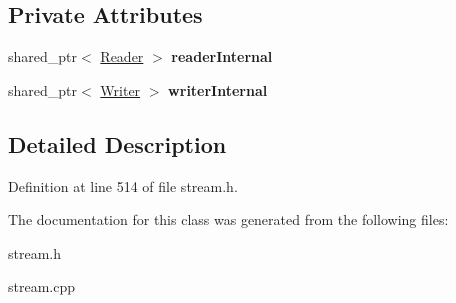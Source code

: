 \subsection*{Private Attributes}
\begin{DoxyCompactItemize}
\item 
\hypertarget{classStreamPipe_a064228ea3b24262abcfe7247c60fdf87}{shared\+\_\+ptr$<$ \hyperlink{classReader}{Reader} $>$ {\bfseries reader\+Internal}}\label{classStreamPipe_a064228ea3b24262abcfe7247c60fdf87}

\item 
\hypertarget{classStreamPipe_a7ec905352427510572e548323e6653b2}{shared\+\_\+ptr$<$ \hyperlink{classWriter}{Writer} $>$ {\bfseries writer\+Internal}}\label{classStreamPipe_a7ec905352427510572e548323e6653b2}

\end{DoxyCompactItemize}


\subsection{Detailed Description}


Definition at line 514 of file stream.\+h.



The documentation for this class was generated from the following files\+:\begin{DoxyCompactItemize}
\item 
stream.\+h\item 
stream.\+cpp\end{DoxyCompactItemize}
